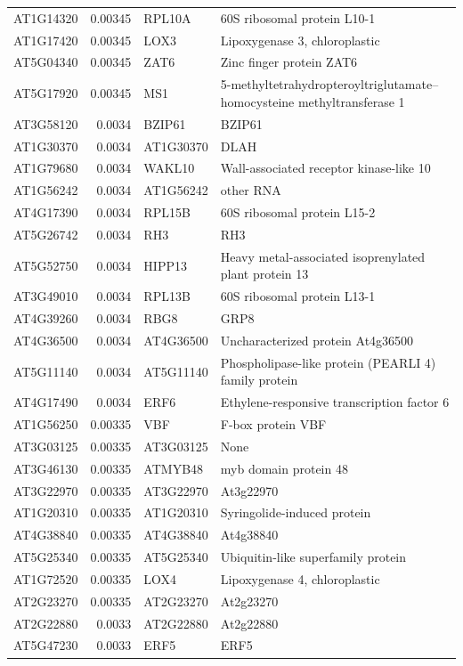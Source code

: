 \documentclass[11pt]{article}
\begin{document}
\begin{center}
\begin{tabular}{lrll}
AT1G14320 & 0.00345 & RPL10A & 60S ribosomal protein L10-1\\
AT1G17420 & 0.00345 & LOX3 & Lipoxygenase 3, chloroplastic\\
AT5G04340 & 0.00345 & ZAT6 & Zinc finger protein ZAT6\\
AT5G17920 & 0.00345 & MS1 & 5-methyltetrahydropteroyltriglutamate--homocysteine methyltransferase 1\\
AT3G58120 & 0.0034 & BZIP61 & BZIP61\\
AT1G30370 & 0.0034 & AT1G30370 & DLAH\\
AT1G79680 & 0.0034 & WAKL10 & Wall-associated receptor kinase-like 10\\
AT1G56242 & 0.0034 & AT1G56242 & other RNA\\
AT4G17390 & 0.0034 & RPL15B & 60S ribosomal protein L15-2\\
AT5G26742 & 0.0034 & RH3 & RH3\\
AT5G52750 & 0.0034 & HIPP13 & Heavy metal-associated isoprenylated plant protein 13\\
AT3G49010 & 0.0034 & RPL13B & 60S ribosomal protein L13-1\\
AT4G39260 & 0.0034 & RBG8 & GRP8\\
AT4G36500 & 0.0034 & AT4G36500 & Uncharacterized protein At4g36500\\
AT5G11140 & 0.0034 & AT5G11140 & Phospholipase-like protein (PEARLI 4) family protein\\
AT4G17490 & 0.0034 & ERF6 & Ethylene-responsive transcription factor 6\\
AT1G56250 & 0.00335 & VBF & F-box protein VBF\\
AT3G03125 & 0.00335 & AT3G03125 & None\\
AT3G46130 & 0.00335 & ATMYB48 & myb domain protein 48\\
AT3G22970 & 0.00335 & AT3G22970 & At3g22970\\
AT1G20310 & 0.00335 & AT1G20310 & Syringolide-induced protein\\
AT4G38840 & 0.00335 & AT4G38840 & At4g38840\\
AT5G25340 & 0.00335 & AT5G25340 & Ubiquitin-like superfamily protein\\
AT1G72520 & 0.00335 & LOX4 & Lipoxygenase 4, chloroplastic\\
AT2G23270 & 0.00335 & AT2G23270 & At2g23270\\
AT2G22880 & 0.0033 & AT2G22880 & At2g22880\\
AT5G47230 & 0.0033 & ERF5 & ERF5\\

\end{tabular}
\end{center}
\end{document}
